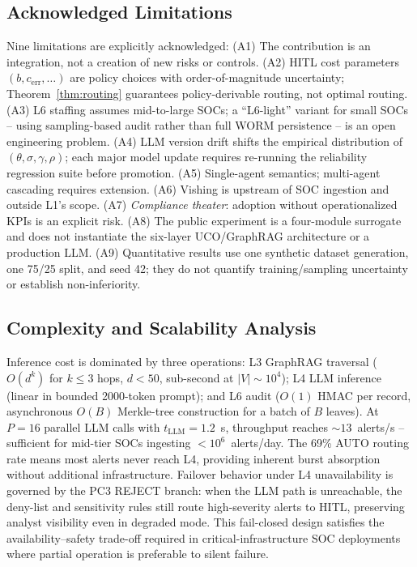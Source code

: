 \documentclass[journal]{IEEEtran}
\begin{document}
\subsection{Acknowledged Limitations}
Nine limitations are explicitly acknowledged:
(A1) The contribution is an integration, not a creation of new risks or controls.
(A2) HITL cost parameters $(b, c_{\text{err}}, \ldots)$ are policy choices with order-of-magnitude
uncertainty; Theorem~\ref{thm:routing} guarantees policy-derivable routing, not optimal routing.
(A3) L6 staffing assumes mid-to-large SOCs; a ``L6-light'' variant for small SOCs -- using
sampling-based audit rather than full WORM persistence -- is an open engineering problem.
(A4) LLM version drift shifts the empirical distribution of $(\theta, \sigma, \gamma, \rho)$;
each major model update requires re-running the reliability regression suite before promotion.
(A5) Single-agent semantics; multi-agent cascading \cite{owasp2025agentic} requires extension.
(A6) Vishing is upstream of SOC ingestion and outside L1's scope.
(A7) \emph{Compliance theater}: adoption without operationalized KPIs is an explicit risk.
(A8) The public experiment is a four-module surrogate and does not instantiate the six-layer
UCO/GraphRAG architecture or a production LLM.
(A9) Quantitative results use one synthetic dataset generation, one 75/25 split, and seed 42;
they do not quantify training/sampling uncertainty or establish non-inferiority.

\subsection{Complexity and Scalability Analysis}
\label{ssec:complexity}
Inference cost is dominated by three operations: L3 GraphRAG traversal ($O(d^k)$ for $k{\leq}3$
hops, $d{<}50$, sub-second at $|V|{\sim}10^4$); L4 LLM inference (linear in bounded 2000-token
prompt); and L6 audit ($O(1)$ HMAC per record, asynchronous $O(B)$ Merkle-tree construction
for a batch of $B$ leaves).
At $P{=}16$ parallel LLM calls with $t_{\text{LLM}}{=}1.2$~s, throughput reaches
${\sim}13$~alerts/s -- sufficient for mid-tier SOCs ingesting ${<}10^6$~alerts/day.
The 69\% AUTO routing rate means most alerts never reach L4, providing inherent burst
absorption without additional infrastructure.
Failover behavior under L4 unavailability is governed by the PC3 REJECT branch:
when the LLM path is unreachable, the deny-list and sensitivity rules still route
high-severity alerts to HITL, preserving analyst visibility even in degraded mode.
This fail-closed design satisfies the availability--safety trade-off required in
critical-infrastructure SOC deployments where partial operation is preferable to
silent failure.
\end{document}
